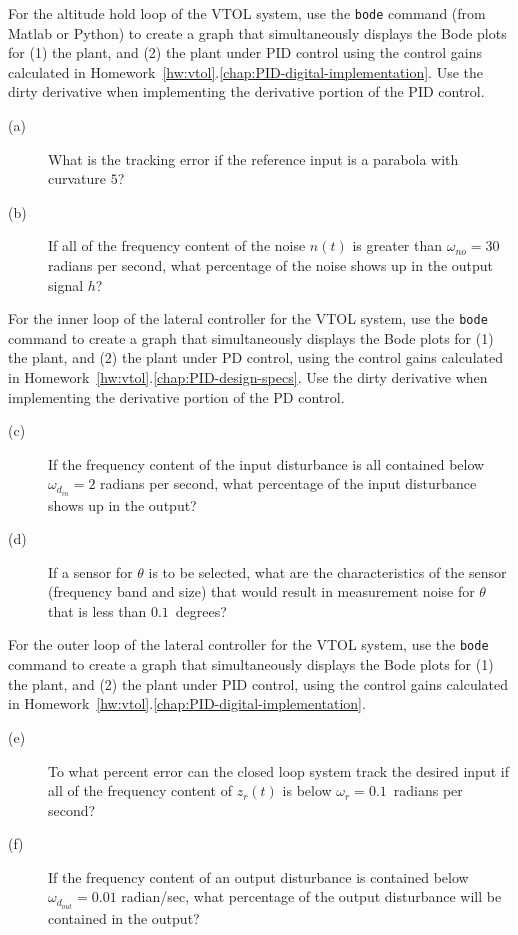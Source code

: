 For the altitude hold loop of the VTOL system, use the \texttt{bode} command (from Matlab or Python) to create a graph that simultaneously displays the Bode plots for (1) the plant, and (2) the plant under PID control using the control gains calculated in Homework~\ref{hw:vtol}.\ref{chap:PID-digital-implementation}.  Use the dirty derivative when implementing the derivative portion of the PID control. 
 
\begin{description}
\item[(a)]  What is the tracking error if the reference input is a parabola with curvature $5$?
\item[(b)]  If all of the frequency content of the noise $n(t)$ is greater than $\omega_{no} = 30$ radians per second, what percentage of the noise shows up in the output signal $h$?
\end{description}

For the inner loop of the lateral controller for the VTOL system, use the \texttt{bode} command to create a graph that simultaneously displays the Bode plots for (1) the plant,  and (2) the plant under PD control,  using the control gains calculated in Homework~\ref{hw:vtol}.\ref{chap:PID-design-specs}.  Use the dirty derivative when implementing the derivative portion of the PD control.

\begin{description}
\item[(c)] If the frequency content of the input disturbance is all contained below $\omega_{d_{in}}=2$ radians per second, what percentage of the input disturbance shows up in the output?
\item[(d)] If a sensor for $\theta$ is to be selected, what are the characteristics of the sensor (frequency band and size) that would result in measurement noise for $\theta$ that is less than $0.1$~degrees?
\end{description}

For the outer loop of the lateral controller for the VTOL system, use the \texttt{bode} command to create a graph that simultaneously displays the Bode plots for (1) the plant,  and (2) the plant under PID control,  using the control gains calculated in Homework~\ref{hw:vtol}.\ref{chap:PID-digital-implementation}. 

\begin{description}
\item[(e)]  To what percent error can the closed loop system track the desired input if all of the frequency content of $z_r(t)$ is below $\omega_r = 0.1$~radians per second?
\item[(f)] If the frequency content of an output disturbance is contained below $\omega_{d_{out}}=0.01$ radian/sec, what percentage of the output disturbance will be contained in the output?
\end{description}

